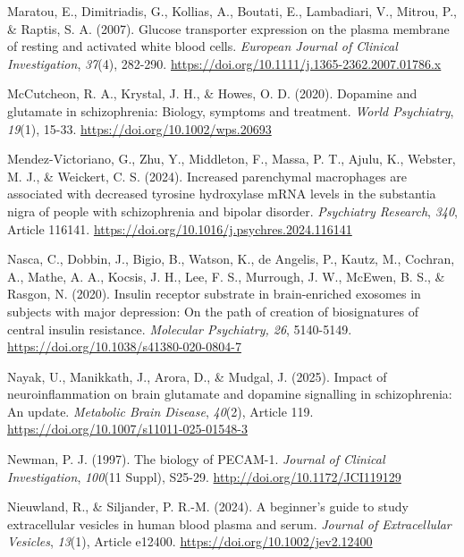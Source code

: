 \documentclass[authordate, empirical]{jote-new-article}
\begin{document}
	Maratou, E., Dimitriadis, G., Kollias, A., Boutati, E., Lambadiari, V., Mitrou, P., \& Raptis, S. A. (2007). Glucose transporter expression on the plasma membrane of resting and activated white blood cells. \emph{European Journal of Clinical Investigation},\emph{ 37}(4), 282-290. \url{https://doi.org/10.1111/j.1365-2362.2007.01786.x}



	McCutcheon, R. A., Krystal, J. H., \& Howes, O. D. (2020). Dopamine and glutamate in schizophrenia: Biology, symptoms and treatment. \emph{World Psychiatry},\emph{ 19}(1), 15-33. \url{https://doi.org/10.1002/wps.20693}



	Mendez-Victoriano, G., Zhu, Y., Middleton, F., Massa, P. T., Ajulu, K., Webster, M. J., \& Weickert, C. S. (2024). Increased parenchymal macrophages are associated with decreased tyrosine hydroxylase mRNA levels in the substantia nigra of people with schizophrenia and bipolar disorder. \emph{Psychiatry Research},\emph{ 340}, Article 116141. \url{https://doi.org/10.1016/j.psychres.2024.116141}



	Nasca, C., Dobbin, J., Bigio, B., Watson, K., de Angelis, P., Kautz, M., Cochran, A., Mathe, A. A., Kocsis, J. H., Lee, F. S., Murrough, J. W., McEwen, B. S., \& Rasgon, N. (2020). Insulin receptor substrate in brain-enriched exosomes in subjects with major depression: On the path of creation of biosignatures of central insulin resistance. \emph{Molecular Psychiatry, 26}, 5140-5149. \url{https://doi.org/10.1038/s41380-020-0804-7}



	Nayak, U., Manikkath, J., Arora, D., \& Mudgal, J. (2025). Impact of neuroinflammation on brain glutamate and dopamine signalling in schizophrenia: An update. \emph{Metabolic Brain Disease},\emph{ 40}(2), Article 119. \url{https://doi.org/10.1007/s11011-025-01548-3}



	Newman, P. J. (1997). The biology of PECAM-1. \emph{Journal of Clinical Investigation},\emph{ 100}(11 Suppl), S25-29. \url{http://doi.org/10.1172/JCI119129}



	Nieuwland, R., \& Siljander, P. R.-M. (2024). A beginner's guide to study extracellular vesicles in human blood plasma and serum. \emph{Journal of Extracellular Vesicles},\emph{ 13}(1), Article e12400. \url{https://doi.org/10.1002/jev2.12400}
\end{document}
